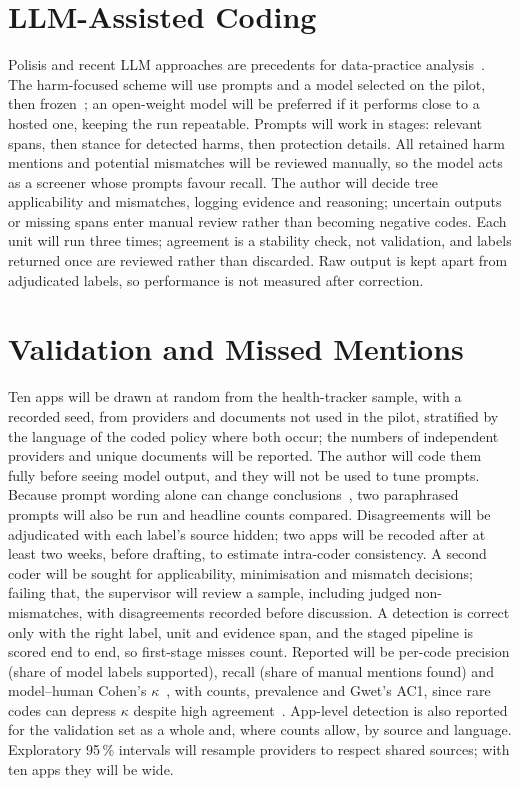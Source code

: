 \section{LLM-Assisted Coding} Polisis and recent LLM approaches are precedents for
data-practice analysis~\parencite{harkous2018polisis,rodriguez2024llm}. The
harm-focused scheme will use prompts and a model selected on the pilot, then
frozen~\parencite{tornberg2024best}; an open-weight model will be preferred if
it performs close to a hosted one, keeping the run repeatable. Prompts will
work in stages: relevant spans, then stance for detected harms, then
protection details. All retained harm mentions and potential mismatches will
be reviewed manually, so the model acts as a screener whose prompts favour
recall. The author will decide tree applicability and mismatches, logging
evidence and reasoning; uncertain outputs or missing spans enter manual
review rather than becoming negative codes. Each unit will run three times;
agreement is a stability check, not validation, and labels returned once are
reviewed rather than discarded. Raw output is kept apart from adjudicated
labels, so performance is not measured after correction.

\section{Validation and Missed Mentions} Ten apps will be drawn at random from
the health-tracker sample, with a recorded seed, from providers and documents not used in
the pilot, stratified by the language of the coded policy where both occur;
the numbers of independent providers and unique documents will be reported.
The author will code them fully before seeing model output, and they will not
be used to tune prompts. Because prompt wording alone can change
conclusions~\parencite{baumann2025llm}, two paraphrased prompts will also be
run and headline counts compared. Disagreements will be adjudicated with each
label's source hidden; two apps will be recoded after at least two weeks,
before drafting, to estimate intra-coder consistency. A second coder will be
sought for applicability, minimisation and mismatch decisions; failing that,
the supervisor will review a sample, including judged non-mismatches, with
disagreements recorded before discussion. A detection is correct only with
the right label, unit and evidence span, and the staged pipeline is scored end
to end, so first-stage misses count. Reported will be per-code precision
(share of model labels supported), recall (share of manual mentions found)
and model--human Cohen's $\kappa$~\parencite{cohen1960coefficient}, with
counts, prevalence and Gwet's AC1, since rare codes can depress $\kappa$
despite high agreement~\parencite{feinstein1990high,gwet2008computing}.
App-level detection is also reported for the validation set as a whole and,
where counts allow, by source and language. Exploratory 95\,\% intervals will resample providers to
respect shared sources; with ten apps they will be wide.

